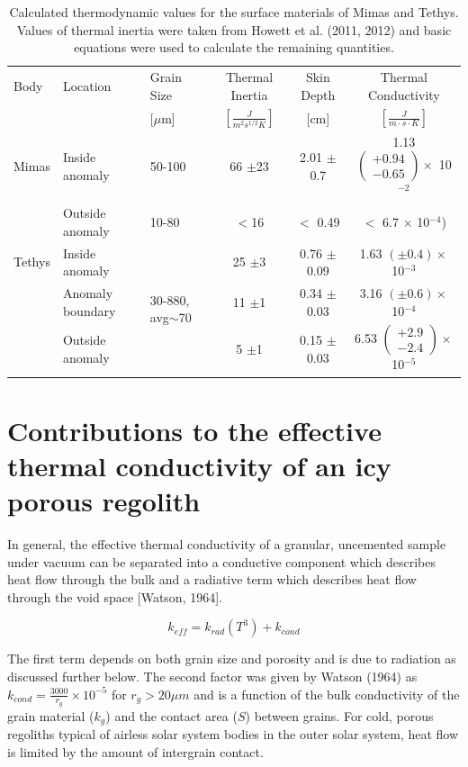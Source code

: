 \documentclass[11pt]{article} %
\begin{document}
	\begin{table}[ht]
		\centering
		\begin{tabular}[c]{ l | l | p{50pt} | c | c | c }
		Body & Location & Grain Size & Thermal Inertia & Skin Depth & Thermal Conductivity \\
		& & [$\mu$m] & $\left[ \frac{J}{m^{2} s^{1/2} K} \right]$ & [cm] & $\left[ \frac{J}{m\cdot s\cdot K} \right]$ \\ \hline
		Mimas & Inside anomaly & 50-100 & 66 $\pm$23 & 2.01 $\pm$0.7 & 1.13 $\left(\substack{+0.94 \\ -0.65} \right) \times$ 10$^{-2}$ \\
			& Outside anomaly & 10-80 & $<$16 & $<$ 0.49 & $<$ 6.7 $\times$ 10$^{-4}$) \\ \hline
		Tethys & Inside anomaly & \multirow{3}{50pt}{ 30-880, avg$\sim$70 } & 25 $\pm$3 & 0.76 $\pm$0.09 & 1.63 $(\pm 0.4) \times$ 10$^{-3}$ \\
			& Anomaly boundary & & 11 $\pm$1 & 0.34 $\pm$0.03 & 3.16 $(\pm 0.6) \times$ 10$^{-4}$ \\
			& Outside anomaly & & 5 $\pm$1 & 0.15 $\pm$0.03 & 6.53 $\left(\substack{+2.9 \\ -2.4} \right) \times$ 10$^{-5}$ \\
		\end{tabular}
		\caption{Calculated thermodynamic values for the surface materials of Mimas and Tethys. Values of thermal inertia were taken from Howett et al. (2011, 2012) and basic equations were used to calculate the remaining quantities.}\label{tab:therm}
	\end{table}
	
\section{Contributions to the effective thermal conductivity of an icy porous regolith}

	In general, the effective thermal conductivity of a granular, uncemented sample under vacuum can be separated into a conductive component which describes heat flow through the bulk and a radiative term which describes heat flow through the void space [Watson, 1964]. 
	
	\begin{equation} \label{eq:TCbasic}
	k_{eff} = k_{rad}(T^{3}) + k_{cond}
	\end{equation} 
	
	The first term depends on both grain size and porosity and is due to radiation as discussed further below. The second factor was given by Watson (1964) as $k_{cond} = \frac{3000}{r_{g}}\times10^{-5}$ for $r_{g} > 20 \mu m$ and is a function of the bulk conductivity of the grain material ($k_{g}$) and the contact area ($S$) between grains. For cold, porous regoliths typical of airless solar system bodies in the outer solar system, heat flow is limited by the amount of intergrain contact.
\end{document}
